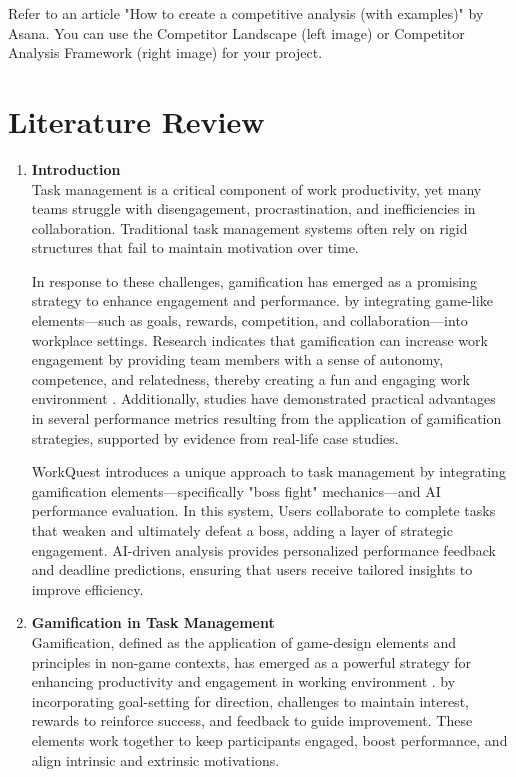 
Refer to an article "How to create a competitive analysis (with
examples)" by Asana. You can use the Competitor Landscape (left image) or
Competitor Analysis Framework (right image) for your project.

\section{Literature Review}
\label{section:literature-review}
\begin{enumerate}
    \item \textbf{Introduction} \\
        Task management is a critical component of work productivity, yet many teams struggle with disengagement, procrastination, and inefficiencies in collaboration.
        Traditional task management systems often rely on rigid structures that fail to maintain motivation over time. 
        
        In response to these challenges, gamification has emerged as a promising strategy to enhance engagement and performance. by integrating game-like elements—such as goals, rewards, competition, and collaboration—into workplace settings. Research indicates that gamification can increase work engagement by providing team members with a sense of autonomy, competence, and relatedness, thereby creating a fun and engaging work environment \cite{ncbi:pmc10905147}.
        Additionally, studies have demonstrated practical advantages in several performance metrics resulting from the application of gamification strategies, supported by evidence from real-life case studies. \cite{Employee:Gamification}

        WorkQuest introduces a unique approach to task management by integrating gamification elements—specifically "boss fight" mechanics—and AI performance evaluation. In this system, Users collaborate to complete tasks that weaken and ultimately defeat a boss, adding a layer of strategic engagement. AI-driven analysis provides personalized performance feedback and deadline predictions, ensuring that users receive tailored insights to improve efficiency.
    
    \item \textbf{Gamification in Task Management} \\
        Gamification, defined as the application of game-design elements and principles in non-game contexts, has emerged as a powerful strategy for enhancing productivity and engagement in working environment \cite{ncbi:pmc10905147} \cite{Employee:Gamification}.
        by incorporating goal-setting for direction, challenges to maintain interest, rewards to reinforce success, and feedback to guide improvement. These elements work together to keep participants engaged, boost performance, and align intrinsic and extrinsic motivations. \cite{Game:Reward}
        

\end{enumerate}
